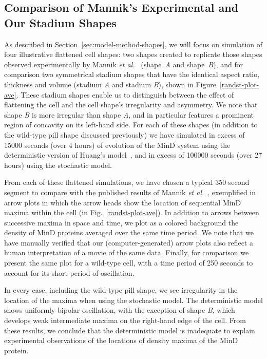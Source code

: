 \documentclass[10pt,letterpaper]{article}
\begin{document}
\subsection*{Comparison of Mannik's Experimental and Our Stadium Shapes}

As described in Section~\ref{sec:model-method-shapes}, we will focus
on simulation of four illustrative flattened cell shapes: two shapes
created to replicate those shapes observed experimentally by
Mannik \emph{et al.}~\cite{mannik2012robustness} (shape~\emph{A} and
shape~\emph{B}), and for comparison two symmetrical stadium shapes
that have the identical aspect ratio, thickness and volume (stadium
\emph{A} and stadium \emph{B}), shown in Figure~\ref{randst-plot-ave}.
These stadium shapes enable us to distinguish between the effect of
flattening the cell and the cell shape's irregularity and asymmetry.
We note that shape \emph{B} is more irregular than shape \emph{A}, and
in particular features a prominent region of concavity on its
left-hand side.  For each of these shapes (in addition to the
wild-type pill shape discussed previously) we have simulated in excess
of 15000 seconds (over 4 hours) of evolution of the MinD system using
the deterministic version of Huang's model~\cite{huang2003dynamic},
and in excess of 100000 seconds (over 27 hours) using the stochastic
model.

From each of these flattened simulations, we have chosen a typical 350
second segment to compare with the published results of
Mannik \emph{et al.}~\cite{mannik2012robustness}, exemplified in arrow plots in
which the arrow heads show the location of sequential MinD maxima
within the cell (in Fig.~\ref{randst-plot-ave}).  In addition to
arrows between successive maxima in space and time, we plot as a
colored background the density of MinD proteins averaged over the same
time period.  We note that we have manually verified that our
(computer-generated) arrow plots also reflect a human interpretation
of a movie of the same data.  Finally, for comparison we present the
same plot for a wild-type cell, with a time period of 250 seconds to
account for its short period of oscillation.

In every case, including the wild-type pill shape, we see irregularity
in the location of the maxima when using the stochastic model.  The
deterministic model shows uniformly bipolar oscillation, with the
exception of shape \emph{B}, which develops weak intermediate maxima
on the right-hand edge of the cell.  From these results, we conclude
that the deterministic model is inadequate to explain experimental
observations of the locations of density maxima of the MinD protein.
\end{document}
